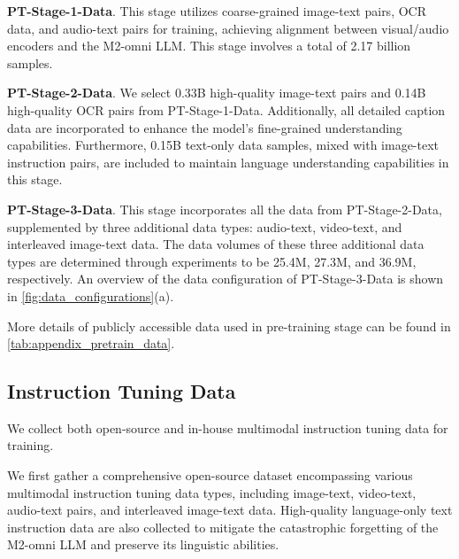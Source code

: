 \textbf{PT-Stage-1-Data}. This stage utilizes coarse-grained image-text pairs, OCR data, and audio-text pairs for training, achieving alignment between visual/audio encoders and the M2-omni LLM. This stage involves a total of 2.17 billion samples.

\textbf{PT-Stage-2-Data}. We select 0.33B high-quality image-text pairs and 0.14B high-quality OCR pairs from PT-Stage-1-Data. Additionally, all detailed caption data are incorporated to enhance the model's fine-grained understanding capabilities. Furthermore, 0.15B text-only data samples, mixed with image-text instruction pairs, are included to maintain language understanding capabilities in this stage.

\textbf{PT-Stage-3-Data}.
This stage incorporates all the data from PT-Stage-2-Data, supplemented by three additional data types: audio-text, video-text, and interleaved image-text data. The data volumes of these three additional data types are determined through experiments to be 25.4M, 27.3M, and 36.9M, respectively. An overview of the data configuration of PT-Stage-3-Data is shown in \cref{fig:data_configurations}(a).

More details of publicly accessible data used in pre-training stage  can be found in \cref{tab:appendix_pretrain_data}.


\subsection{Instruction Tuning Data}\label{subsubsec:app_sft_data}


We collect both open-source and in-house multimodal instruction tuning data for training.

We first gather a comprehensive open-source dataset encompassing various multimodal instruction tuning data types, including image-text, video-text, audio-text pairs, and interleaved image-text data. High-quality language-only text instruction data are also collected to mitigate the catastrophic forgetting of the M2-omni LLM and preserve its linguistic abilities.

